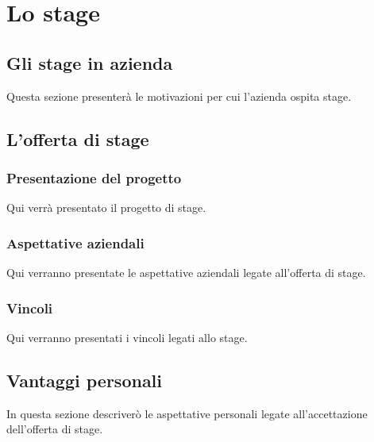 

\chapter{Lo stage}
\label{cap:stage}

\section{Gli stage in azienda}
Questa sezione presenterà le motivazioni per cui l'azienda ospita stage.

\section{L'offerta di stage}

	\subsection{Presentazione del progetto}
	Qui verrà presentato il progetto di stage.
	
	\subsection{Aspettative aziendali}
	Qui verranno presentate le aspettative aziendali legate all'offerta di stage.
	
	\subsection{Vincoli}
	Qui verranno presentati i vincoli legati allo stage.

\section{Vantaggi personali}
In questa sezione descriverò le aspettative personali legate all'accettazione dell'offerta di stage.
